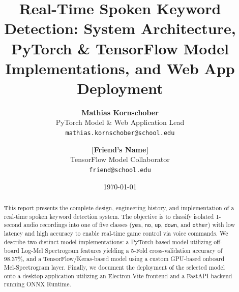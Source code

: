 \documentclass[11pt,a4paper]{article}
\title{\textbf{Real-Time Spoken Keyword Detection: System Architecture, PyTorch \& TensorFlow Model Implementations, and Web App Deployment}}
\author{
  \textbf{Mathias Kornschober} \\
  PyTorch Model \& Web Application Lead \\
  \texttt{mathias.kornschober@school.edu}
  \and
  \textbf{[Friend's Name]} \\
  TensorFlow Model Collaborator \\
  \texttt{friend@school.edu}
}
\date{\today}
\begin{document}
\maketitle

\begin{abstract}
This report presents the complete design, engineering history, and implementation of a real-time spoken keyword detection system. The objective is to classify isolated 1-second audio recordings into one of five classes (\texttt{yes}, \texttt{no}, \texttt{up}, \texttt{down}, and \texttt{other}) with low latency and high accuracy to enable real-time game control via voice commands. We describe two distinct model implementations: a PyTorch-based model utilizing off-board Log-Mel Spectrogram features yielding a 5-Fold cross-validation accuracy of 98.37\%, and a TensorFlow/Keras-based model using a custom GPU-based onboard Mel-Spectrogram layer. Finally, we document the deployment of the selected model onto a desktop application utilizing an Electron-Vite frontend and a FastAPI backend running ONNX Runtime.
\end{abstract}

\newpage
\tableofcontents
\newpage


\newpage

\newpage

\end{document}
